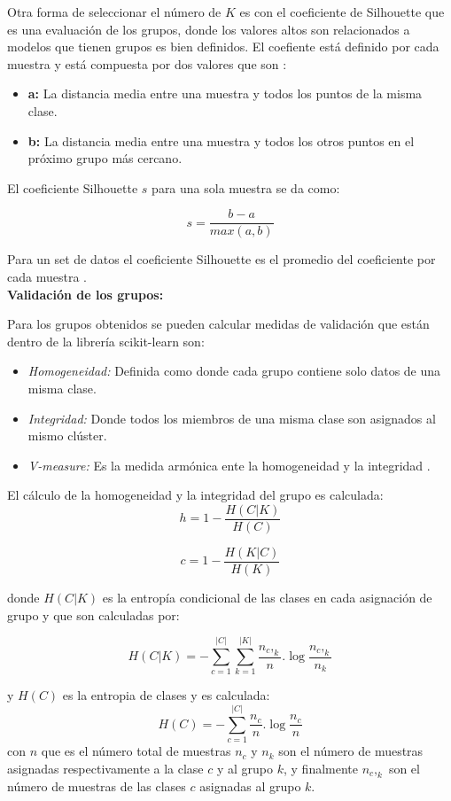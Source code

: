 {Otra forma de seleccionar el número de $K$ es con el coeficiente de Silhouette que es una evaluación de los grupos, donde los valores altos son relacionados a modelos que tienen grupos es bien definidos. El coefiente está definido por cada muestra y está compuesta por dos valores que son \cite{scikit-learn,Rousseeuw1987}:

\begin{itemize}
	\item \textbf{a:} La distancia media entre una muestra y todos los puntos de la misma clase.
	\item \textbf{b:} La distancia media entre una muestra y todos los otros puntos en el próximo grupo más cercano.
\end{itemize}

El coeficiente Silhouette $s$ para una sola muestra se da como:

$$s = \frac{b-a}{max(a,b)}$$

Para un set de datos el coeficiente Silhouette es el promedio del coeficiente por cada muestra \cite{scikit-learn,Rousseeuw1987}. \\

\textbf{Validación de los grupos:}

Para los grupos obtenidos se pueden calcular  medidas de validación que están dentro de la librería scikit-learn \cite{scikit-learn} son:

\begin{itemize}
	\item  \textit{Homogeneidad:} Definida como donde cada grupo contiene solo datos de una misma clase.
	\item \textit{Integridad:} Donde todos los miembros de una misma clase son asignados al mismo clúster.	
	\item \textit{V-measure:} Es la medida armónica ente la homogeneidad y la integridad \cite{Rosenberg2007}. 		
\end{itemize}

El cálculo de la homogeneidad y la integridad del grupo es calculada:
$$h=1- \frac{H(C|K)}{H(C)} $$

$$c=1- \frac{H(K|C)}{H(K)}$$

donde $H(C|K)$ es la entropía condicional de las clases en cada asignación de grupo y que son calculadas por:

$$H(C|K)= - \sum_{c=1}^{|C|} \sum_{k=1}^{|K|} \frac{n_c,_k}{n} . \log \frac{n_c,_k}{n_k}$$ 

y $H(C)$ es la entropia de clases y es calculada:
$$H(C)=  - \sum_{c=1}^{|C|} \frac{n_c}{n} . \log \frac{n_c}{n}$$ 
con $n$ que es el número total de muestras $n_c$ y $n_k$ son el número de muestras asignadas respectivamente a la clase $c$ y al grupo $k$, y finalmente $n_c,_k$ son el número de muestras de las clases $c$ asignadas al grupo $k$.\\

}
